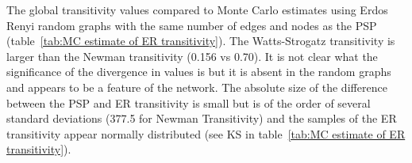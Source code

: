 
The global transitivity values compared to Monte Carlo estimates using Erdos Renyi random graphs with the same number of edges and nodes as the PSP (table~\ref{tab:MC estimate of ER transitivity}). The Watts-Strogatz transitivity is larger than the Newman transitivity (0.156 vs 0.70). It is not clear what the significance of the divergence in values is \cite{newman2018networks} but it is absent in the random graphs and appears to be a feature of the network. The absolute size of the difference between the PSP and ER transitivity is small but is of the order of several standard deviations (377.5 for Newman Transitivity) and the samples of the ER transitivity appear normally distributed (see KS in table~\ref{tab:MC estimate of ER transitivity}).


